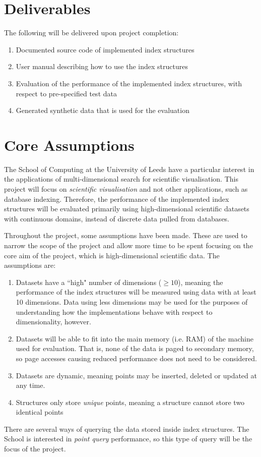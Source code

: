 \section{Deliverables}
\label{sec:deliverables}

The following will be delivered upon project completion:
\begin{enumerate}
	\item Documented source code of implemented index structures
	\item User manual describing how to use the index structures
	\item Evaluation of the performance of the implemented index structures, with respect to pre-specified test data
	\item Generated synthetic data that is used for the evaluation
\end{enumerate}

\section{Core Assumptions}
\label{sec:core-assumptions}

The School of Computing at the University of Leeds have a particular interest in the applications of multi-dimensional search for scientific visualisation. This project will focus on \textit{scientific visualisation} and not other applications, such as database indexing. Therefore, the performance of the implemented index structures will be evaluated primarily using high-dimensional scientific datasets with continuous domains, instead of discrete data pulled from databases.

Throughout the project, some assumptions have been made. These are used to narrow the scope of the project and allow more time to be spent focusing on the core aim of the project, which is high-dimensional scientific data. The assumptions are:
\begin{enumerate}
	\item Datasets have a ``high" number of dimensions ($\geq 10$), meaning the performance of the index structures will be measured using data with at least 10 dimensions. Data using less dimensions may be used for the purposes of understanding how the implementations behave with respect to dimensionality, however.
	\item Datasets will be able to fit into the main memory (i.e. RAM) of the machine used for evaluation. That is, none of the data is paged to secondary memory, so page accesses causing reduced performance does not need to be considered.
	\item Datasets are dynamic, meaning points may be inserted, deleted or updated at any time.
	\item Structures only store \textit{unique} points, meaning a structure cannot store two identical points
\end{enumerate}

There are several ways of querying the data stored inside index structures. The School is interested in \textit{point query} performance, so this type of query will be the focus of the project.